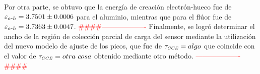 Por otra parte, se obtuvo que la energía de creación electrón-hueco fue de $\varepsilon_{e\mbox{-}h} = 3.7501 \pm 0.0006$ para el aluminio, mientras que para el flúor fue de $\varepsilon_{e\mbox{-}h} = 3.7363 \pm 0.0047$.
\textcolor{red}{\#\#\#\#-------------------}
Finalmente, se logró determinar el ancho de la región de colección parcial de carga del sensor mediante la utilización del nuevo modelo de ajuste de los picos, que fue de $\tau_{\scaleto{CCE}{4pt}} = algo$ que coincide con el valor de $\tau_{\scaleto{CCE}{4pt}} = otra\ cosa$ obtenido mediante otro método.
\textcolor{red}{-------------------\#\#\#\#}


